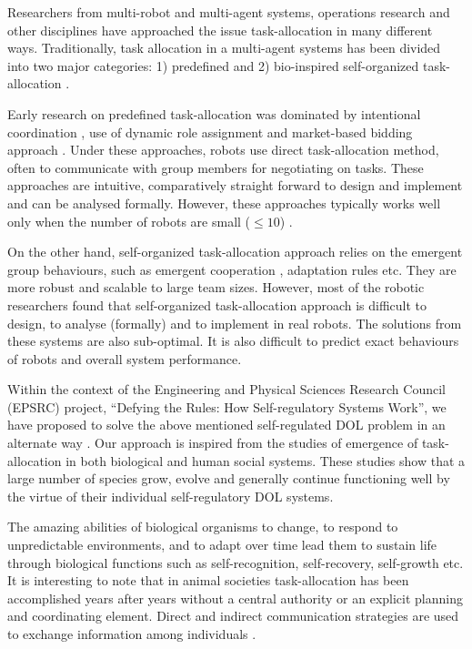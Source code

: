 Researchers from multi-robot and multi-agent systems, operations research and other disciplines have approached the issue task-allocation in many different ways. Traditionally, task allocation in a multi-agent systems has been divided into two major categories: 1) predefined and 2) bio-inspired self-organized task-allocation \cite{Shen+2001}.

Early research on predefined task-allocation was dominated by intentional coordination \cite{Parker2008}, use of dynamic role assignment \cite{Chaimowicz2002} and market-based bidding approach \cite{Dias+2006}. Under these approaches, robots use direct task-allocation method, often to communicate with group members for negotiating on tasks. These approaches are intuitive, comparatively straight forward to design and implement and can be analysed formally. However, these approaches typically works well only when the number of robots are small ($\leq 10$) \cite{Lerman+2006}.

On the other hand, self-organized task-allocation approach relies on the emergent group behaviours, such as emergent cooperation , adaptation rules  etc. They are more robust and scalable to large team sizes. However, most of the robotic researchers found that self-organized task-allocation approach is difficult to design, to analyse (formally) and to implement in real robots. The solutions from these systems are also sub-optimal. It is also difficult to predict exact behaviours of robots and overall system performance.

Within the context of the Engineering and Physical Sciences Research Council (EPSRC) project, ``Defying the Rules: How Self-regulatory Systems Work'', we have proposed to solve the above mentioned self-regulated DOL problem in an alternate way \cite{Arcaute+2008}. Our approach is inspired from the studies of emergence of task-allocation in both biological and human social systems. These studies show that a large number of species grow, evolve and generally continue functioning well by the virtue of their individual self-regulatory DOL systems.

The amazing abilities of biological organisms to change, to respond to unpredictable environments, and to adapt over time lead them to sustain life through biological functions such as self-recognition, self-recovery, self-growth etc. It is interesting to note that in animal societies task-allocation has been accomplished years after years without a central authority or an explicit planning and coordinating element. Direct and indirect communication strategies are used to exchange information among individuals \cite{Camazine+2001}.

